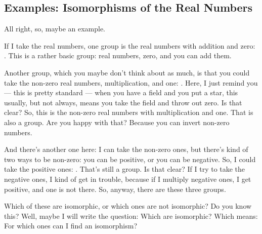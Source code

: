 \begin{hidden}
\end{hidden}

\subsection{Examples: Isomorphisms of the Real Numbers}

\begin{speech}[00:12:43 - 00:14:43]
All right, so, maybe an example.

If I take the real numbers, one group is the real numbers with addition and zero: . This is a rather basic group: real numbers, zero, and you can add them.

Another group, which you maybe don't think about as much, is that you could take the non-zero real numbers, multiplication, and one: . Here, I just remind you --- this is pretty standard --- when you have a field and you put a star,  this usually, but not always, means you take the field and throw out zero. Is that clear? So, this is the non-zero real numbers with multiplication and one. That is also a group. Are you happy with that? Because you can invert non-zero numbers.

And there's another one here: I can take the non-zero ones, but there's kind of two ways to be non-zero: you can be positive, or you can be negative. So, I could take the positive ones: . That's still a group. Is that clear? If I try to take the negative ones, I kind of get in trouble, because if I multiply negative ones, I get positive, and one is not there. So, anyway, there are these three groups.

Which of these are isomorphic, or which ones are not isomorphic? Do you know this? Well, maybe I will write the question: Which are isomorphic?  Which means: For which ones can I find an isomorphism?
\end{speech}

